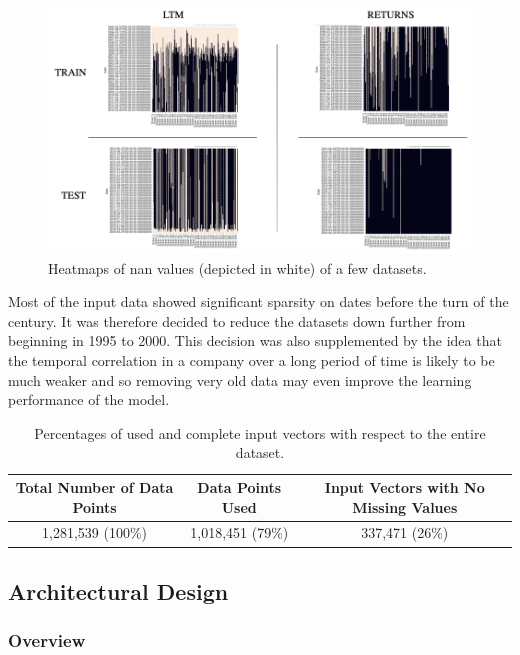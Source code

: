 \documentclass[10pt,onecolumn,letterpaper]{article}
\begin{document}
\begin{figure}[!hbt!]
\centering
\includegraphics[width=\columnwidth]{heatmaps.png}
\caption{Heatmaps of nan values (depicted in white) of a few datasets.}
\end{figure}

Most of the input data showed significant sparsity on dates before the turn of the century. It was therefore decided to reduce the datasets down further from beginning in 1995 to 2000. This decision was also supplemented by the idea that the temporal correlation in a company over a long period of time is likely to be much weaker and so removing very old data may even improve the learning performance of the model.

\begin{table}[hbt!]
\begin{center}
\begin{tabular}{c|c|c}
Total Number of Data Points & Data Points Used & Input Vectors with No Missing Values\\
\hline
1,281,539 (100\%) & 1,018,451 (79\%) & 337,471 (26\%)\\
\end{tabular}
\end{center}
\caption{Percentages of used and complete input vectors with respect to the entire dataset.}
\end{table}



\subsection{Architectural Design} 

\subsubsection{Overview}
\end{document}
